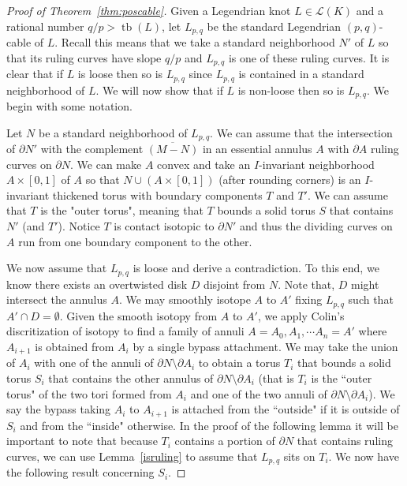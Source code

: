 \documentclass[11pt]{amsart}
\theoremstyle{plain}
\theoremstyle{definition}
\theoremstyle{remark}
\numberwithin{theorem}{section}
\DeclareMathOperator\tb{tb}                   %
\begin{document}
\begin{proof}[Proof of Theorem~\ref{thm:poscable}]
Given a Legendrian knot $L\in \mathcal{L}(K)$ and a rational number $q/p> \tb(L)$, let $L_{p,q}$ be the standard Legendrian $(p,q)$-cable of $L$.  Recall this means that we take a standard neighborhood $N'$ of $L$ so that its ruling curves have slope $q/p$ and $L_{p,q}$ is one of these ruling curves. It is clear that if $L$ is loose then so is $L_{p,q}$ since $L_{p,q}$ is contained in a standard neighborhood of $L$. We will now show that if $L$ is non-loose then so is $L_{p,q}$. We begin with some notation. 

Let $N$ be a standard neighborhood of $L_{p,q}.$ We can assume that the intersection of $\partial N'$ with the complement $\overline{(M-N)}$ in an essential annulus $A$ with $\partial A$ ruling curves on $\partial N$. We can make $A$ convex and take an $I$-invariant neighborhood $A\times[0,1]$ of $A$ so that $N\cup (A\times [0,1])$ (after rounding corners) is an $I$-invariant thickened torus with boundary components $T$ and $T'$. We can assume that $T$ is the "outer torus", meaning that $T$ bounds a solid torus $S$ that contains $N'$ (and $T'$). Notice $T$ is contact isotopic to $\partial N'$ and thus the dividing curves on $A$ run from one boundary component to the other.

We now assume that $L_{p,q}$ is loose and derive a contradiction. To this end, we know there exists an overtwisted disk $D$ disjoint from $N$. Note that, $D$ might intersect the annulus $A$. We may smoothly isotope $A$ to $A'$ fixing $L_{p,q}$ such that $A'\cap D=\emptyset$. Given the smooth isotopy from $A$ to $A'$, we apply Colin's discritization of isotopy \cite{Honda02} to find a family of annuli $A=A_0, A_1,\cdots A_n=A'$ where $A_{i+1}$ is obtained from $A_i$ by a single bypass attachment. We may take the union of $A_i$ with one of the annuli of $\partial N\setminus \partial A_i$ to obtain a torus $T_i$ that bounds a solid torus $S_i$ that contains the other annulus of $\partial N\setminus \partial A_i$ (that is $T_i$ is the ``outer torus" of the two tori formed from $A_i$ and one of the two annuli of $\partial N\setminus \partial A_i$). We say the bypass taking $A_i$ to $A_{i+1}$ is attached from the ``outside" if it is outside of $S_i$ and from the ``inside" otherwise. In the proof of the following lemma it will be important to note that because $T_i$ contains a portion of $\partial N$ that contains ruling curves, we can use Lemma~\ref{isruling} to assume that $L_{p,q}$ sits on $T_i$. We now have the following result concerning $S_i$.


\end{proof}
\end{document}
